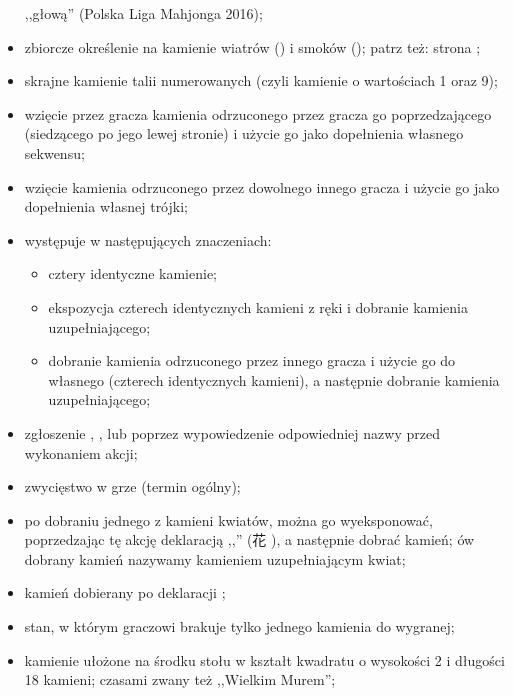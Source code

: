 \begin{itemize}
,,głową'' (Polska Liga Mahjonga 2016);
\item {}
zbiorcze określenie na kamienie wiatrów (\wiatry) i smoków (\smoki); patrz też:
strona \pageref{wiatry};
\item {}
skrajne kamienie talii numerowanych (czyli kamienie o wartościach 1 oraz 9);
\item {}
wzięcie przez gracza kamienia odrzuconego przez gracza go poprzedzającego
(siedzącego po jego lewej stronie) i użycie go jako dopełnienia własnego
sekwensu;
\item {}
wzięcie kamienia odrzuconego przez dowolnego innego gracza i użycie go jako
dopełnienia własnej trójki; 
\item {}
występuje w następujących znaczeniach:
	\begin{itemize}
	  \item cztery identyczne kamienie;
	  \item ekspozycja czterech identycznych kamieni z ręki i dobranie kamienia
	  uzupełniającego;
	  \item dobranie kamienia odrzuconego przez innego gracza i użycie go do
	  własnego  (czterech identycznych kamieni), a następnie dobranie
	  kamienia uzupełniającego;
	\end{itemize}
\item {}
zgłoszenie , ,  lub
\hu poprzez wypowiedzenie odpowiedniej nazwy przed wykonaniem akcji;
\item {}
zwycięstwo w grze (termin ogólny);
\item {}
po dobraniu jednego z kamieni kwiatów, można go wyeksponować, poprzedzając tę
akcję deklaracją ,,'' (花 ), a następnie dobrać kamień;
ów dobrany kamień nazywamy kamieniem uzupełniającym kwiat;
\item {}
kamień dobierany po deklaracji ;
\item {}
stan, w którym graczowi brakuje tylko jednego kamienia do wygranej;
\item {}
kamienie ułożone na środku stołu w kształt kwadratu o wysokości 2 i długości 18
kamieni; czasami zwany też ,,Wielkim Murem'';

\end{itemize}
